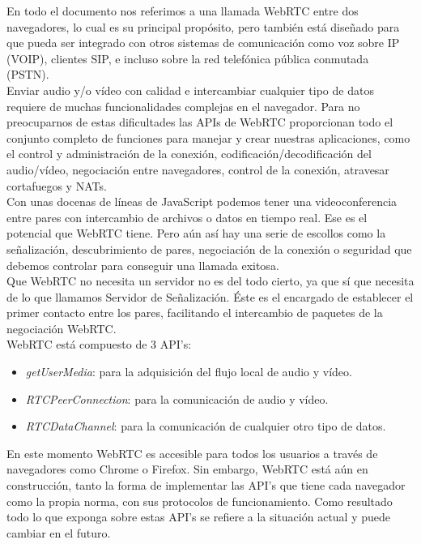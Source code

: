 En todo el documento nos referimos a una llamada WebRTC entre dos navegadores, lo cual es su principal propósito, pero también está diseñado para que pueda ser integrado con otros sistemas de comunicación como voz sobre IP (VOIP), clientes SIP, e incluso sobre la red telefónica pública conmutada (PSTN).\\

Enviar audio y/o vídeo con calidad e intercambiar cualquier tipo de datos requiere de muchas funcionalidades complejas en el navegador. Para no preocuparnos de estas dificultades las APIs de WebRTC proporcionan todo el conjunto completo de funciones para manejar y crear nuestras aplicaciones, como el control y administración de la conexión, codificación/decodificación del audio/vídeo, negociación entre navegadores, control de la conexión, atravesar cortafuegos y NATs.\\

Con unas docenas de líneas de JavaScript podemos tener una videoconferencia entre pares con intercambio de archivos o datos en tiempo real. Ese es el potencial que WebRTC tiene. Pero aún así hay una serie de escollos como la señalización, descubrimiento de pares, negociación de la conexión o seguridad que debemos controlar para conseguir una llamada exitosa.\\

Que WebRTC no necesita un servidor no es del todo cierto, ya que sí que necesita de lo que llamamos Servidor de Señalización. Éste es el encargado de establecer el primer contacto entre los pares, facilitando el intercambio de paquetes de la negociación WebRTC.\\

\noindent WebRTC está compuesto de 3 API's:

\begin{itemize}
\item \emph{getUserMedia}: para la adquisición del flujo local de audio y vídeo.
\item \emph{RTCPeerConnection}: para la comunicación de audio y vídeo.
\item \emph{RTCDataChannel}: para la comunicación de cualquier otro tipo de datos.
\end{itemize}

En este momento WebRTC es accesible para todos los usuarios a través de navegadores como Chrome o Firefox. Sin embargo, WebRTC está aún en construcción, tanto la forma de implementar las API's que tiene cada navegador como la propia norma, con sus protocolos de funcionamiento. Como resultado todo lo que exponga sobre estas API's se refiere a la situación actual y puede cambiar en el futuro.\\

